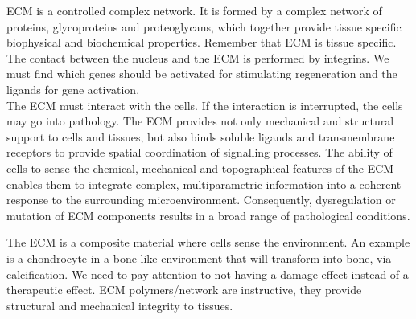\noindent
ECM is a controlled complex network. It is formed by a complex network of proteins, glycoproteins and proteoglycans, which together provide tissue specific biophysical and biochemical properties. Remember that ECM is tissue specific. The contact between the nucleus and the ECM is performed by integrins. We must find which genes should be activated for stimulating regeneration and the ligands for gene activation.
\\
\noindent
The ECM must interact with the cells. If the interaction is interrupted, the cells may go into pathology.
The ECM provides not only mechanical and structural support to cells and tissues, but also binds soluble ligands and transmembrane receptors to provide spatial coordination of signalling processes.
The ability of cells to sense the chemical, mechanical and topographical features of the ECM enables them to integrate complex, multiparametric information into a coherent response to the surrounding microenvironment.
Consequently, dysregulation or mutation of ECM components results in a broad range of pathological conditions.

The ECM is a composite material where cells sense the environment.
An example is a chondrocyte in a bone-like environment that will transform into bone, via calcification.
We need to pay attention to not having a damage effect instead of a therapeutic effect.
ECM polymers/network are instructive,  they provide structural and mechanical integrity to tissues.

